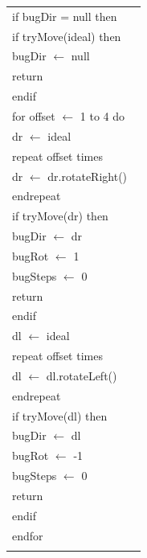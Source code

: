\documentclass{article}
\newenvironment{pseudobox}
{
\centering
\begin{longtable}{|p{0.94\linewidth}|}
\hline
}
{
\\ \hline
\end{longtable}
\vspace{0.05cm}
}
\begin{document}
\begin{pseudobox}
\hspace*{1em} if bugDir = null then \\
\hspace*{2em} if tryMove(ideal) then \\
\hspace*{3em} bugDir $\leftarrow$ null \\
\hspace*{3em} return \\
\hspace*{2em} endif \\

\hspace*{2em} for offset $\leftarrow$ 1 to 4 do \\
\hspace*{3em} dr $\leftarrow$ ideal \\
\hspace*{3em} repeat offset times \\
\hspace*{4em} dr $\leftarrow$ dr.rotateRight() \\
\hspace*{3em} endrepeat \\
\hspace*{3em} if tryMove(dr) then \\
\hspace*{4em} bugDir $\leftarrow$ dr \\
\hspace*{4em} bugRot $\leftarrow$ 1 \\
\hspace*{4em} bugSteps $\leftarrow$ 0 \\
\hspace*{4em} return \\
\hspace*{3em} endif \\

\hspace*{3em} dl $\leftarrow$ ideal \\
\hspace*{3em} repeat offset times \\
\hspace*{4em} dl $\leftarrow$ dl.rotateLeft() \\
\hspace*{3em} endrepeat \\
\hspace*{3em} if tryMove(dl) then \\
\hspace*{4em} bugDir $\leftarrow$ dl \\
\hspace*{4em} bugRot $\leftarrow$ -1 \\
\hspace*{4em} bugSteps $\leftarrow$ 0 \\
\hspace*{4em} return \\
\hspace*{3em} endif \\
\hspace*{2em} endfor \\


\end{pseudobox}
\end{document}

